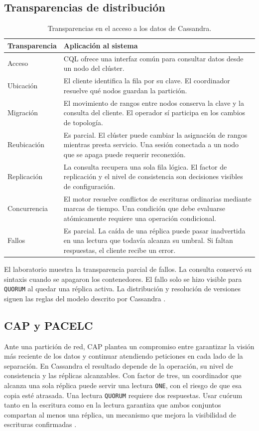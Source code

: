 \documentclass[12pt,a4paper]{article}
\begin{document}
\subsection{Transparencias de distribución}
\begin{table}[htbp]
\small\centering
\caption{Transparencias en el acceso a los datos de Cassandra.}
\begin{tabularx}{\linewidth}{@{}lX@{}}
\toprule
Transparencia & Aplicación al sistema \\
\midrule
Acceso & CQL ofrece una interfaz común para consultar datos desde un nodo del clúster. \\
Ubicación & El cliente identifica la fila por su clave. El coordinador resuelve qué nodos guardan la partición. \\
Migración & El movimiento de rangos entre nodos conserva la clave y la consulta del cliente. El operador sí participa en los cambios de topología. \\
Reubicación & Es parcial. El clúster puede cambiar la asignación de rangos mientras presta servicio. Una sesión conectada a un nodo que se apaga puede requerir reconexión. \\
Replicación & La consulta recupera una sola fila lógica. El factor de replicación y el nivel de consistencia son decisiones visibles de configuración. \\
Concurrencia & El motor resuelve conflictos de escrituras ordinarias mediante marcas de tiempo. Una condición que debe evaluarse atómicamente requiere una operación condicional. \\
Fallos & Es parcial. La caída de una réplica puede pasar inadvertida en una lectura que todavía alcanza su umbral. Si faltan respuestas, el cliente recibe un error. \\
\bottomrule
\end{tabularx}
\end{table}
El laboratorio muestra la transparencia parcial de fallos. La consulta conservó su sintaxis cuando se apagaron los contenedores. El fallo solo se hizo visible para \texttt{QUORUM} al quedar una réplica activa. La distribución y resolución de versiones siguen las reglas del modelo descrito por Cassandra \cite{cassandraDynamo}.

\subsection{CAP y PACELC}
Ante una partición de red, CAP plantea un compromiso entre garantizar la visión más reciente de los datos y continuar atendiendo peticiones en cada lado de la separación. En Cassandra el resultado depende de la operación, su nivel de consistencia y las réplicas alcanzables. Con factor de tres, un coordinador que alcanza una sola réplica puede servir una lectura \texttt{ONE}, con el riesgo de que esa copia esté atrasada. Una lectura \texttt{QUORUM} requiere dos respuestas. Usar cuórum tanto en la escritura como en la lectura garantiza que ambos conjuntos compartan al menos una réplica, un mecanismo que mejora la visibilidad de escrituras confirmadas \cite{cassandraDynamo,ferreira2024}.
\end{document}

